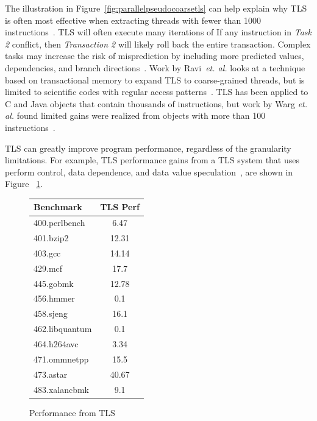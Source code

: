 \documentclass[defaultstyle,11pt]{thesis}
\begin{document}
The illustration in Figure~\ref{fig:parallelpseudocoarsetls} can help
explain why TLS is often most effective when extracting threads with
fewer than 1000 instructions~\cite{marcuello:00:ipdps}.  TLS will
often execute many iterations of If any instruction in \textit{Task 2}
conflict, then \textit{Transaction 2} will likely roll back the entire
transaction.  Complex tasks may increase the risk of misprediction by
including more predicted values, dependencies, and branch
directions~\cite{marcuello:00:ipdps}. Work by Ravi~\textit{et. al.}
looks at a technique based on transactional memory to expand TLS to
coarse-grained threads, but is limited to scientific codes with
regular access patterns~\cite{ramaseshan:08:nc}. TLS has been applied
to C and Java objects that contain thousands of instructions, but work
by Warg \textit{et. al.} found limited gains were realized from
objects with more than 100 instructions~\cite{warg:2001:pact}.

TLS can greatly improve program performance, regardless of the
granularity limitations. For example, TLS performance gains from a TLS
system that uses perform control, data dependence, and data value
speculation~\cite{kejariwal:2007:tap}, are shown in Figure
~\ref{fig:tlsperf}.

\begin{figure}
  \begin{centering}
    \begin{minipage}{\hsize}
      \begin{tabular}{ l c }
        Benchmark & TLS Perf \\
        \hline
        400.perlbench & 6.47 \\
        401.bzip2 & 12.31 \\
        403.gcc & 14.14 \\
        429.mcf & 17.7 \\
        445.gobmk & 12.78 \\
        456.hmmer & 0.1 \\
        458.sjeng & 16.1 \\
        462.libquantum & 0.1 \\
        464.h264avc & 3.34 \\
        471.ommnetpp & 15.5 \\
        473.astar & 40.67 \\
        483.xalancbmk & 9.1 \\
      \end{tabular}
    \end{minipage}
  \end{centering}
  \caption{Performance from TLS~\cite{kejariwal:2007:tap}}
  \label{fig:tlsperf}
\end{figure}
\end{document}

